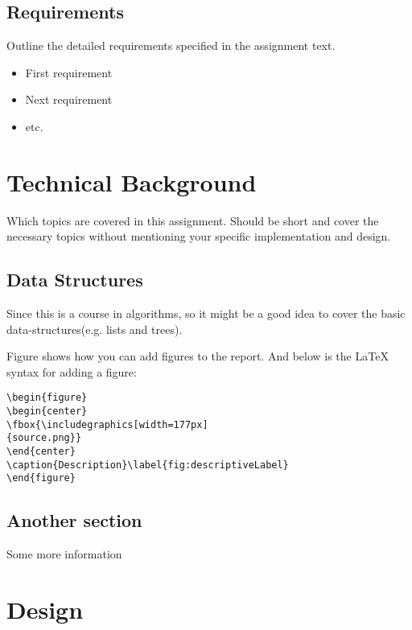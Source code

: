\subsection{Requirements}

Outline the detailed requirements specified in the assignment text.

\begin{itemize}

\item First requirement
\item Next requirement
\item etc.

\end{itemize}


\section{Technical Background}

Which topics are covered in this assignment. Should be short and cover the
necessary topics without mentioning your specific implementation and design.

\subsection{Data Structures}

Since this is a course in algorithms, so it might be a good idea to cover the
basic data-structures(e.g. lists and trees). 

Figure shows how you can add figures to the report. And below is the LaTeX
syntax for adding a figure:

\begin{verbatim}
\begin{figure}
\begin{center}
\fbox{\includegraphics[width=177px]
{source.png}}
\end{center}
\caption{Description}\label{fig:descriptiveLabel}
\end{figure}
\end{verbatim}

\subsection{Another section}

Some more information

\section{Design}

